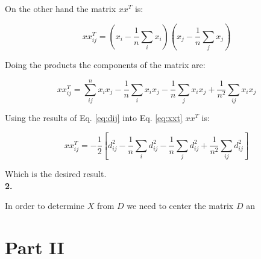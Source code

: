 \documentclass[14pt]{article}
\begin{document}
On the other hand the matrix $xx^T$ is:

\begin{equation}
x x^T_{ij} = (x_i - \dfrac{1}{n}\sum_i x_i )(x_j - \dfrac{1}{n}\sum_j
x_j )
\end{equation}

Doing the products the components of the matrix are:

\begin{equation}\label{eq:xxt}
xx^T_{ij} =  \sum_{ij}^n x_i x_j - \dfrac{1}{n} \sum_i x_i x_j -
\dfrac{1}{n}\sum_j x_i x_j + \dfrac{1}{n^2} \sum_{ij} x_i x_j 
\end{equation}

Using the results of Eq. \ref{eq:dij} into Eq. \ref{eq:xxt} $xx^T$ is:

\begin{equation}
xx^T_{ij} =  -\dfrac{1}{2} \left[  d_{ij}^2 - \dfrac{1}{n}
\sum_i d_{ij}^2 -
\dfrac{1}{n}\sum_j d_{ij}^2 + \dfrac{1}{n^2} \sum_{ij} d_{ij}^2 \right]
\end{equation}

Which is the desired result.\\

\textbf{2.} 

In order to determine $X$ from $D$ we need to center the matrix $D$
an

\section{Part II}
\end{document}
